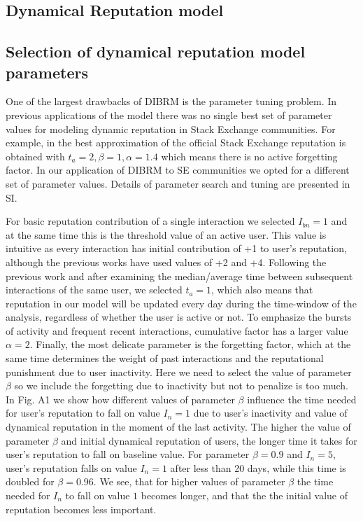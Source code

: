 \subsection{Dynamical Reputation model}

\subsection{Selection of dynamical reputation model parameters} \label{section:param}
One of the largest drawbacks of DIBRM is the parameter tuning problem. In previous applications of the model \cite{melnikovDynamicInteractionBasedReputation2018,yashkina2020} there was no single best set of parameter values for modeling dynamic reputation in Stack Exchange communities. For example, in \cite{yashkina2020} the best approximation of the official Stack Exchange reputation is obtained with $t_a =2, \beta = 1, \alpha = 1.4$ which means there is no active forgetting factor. In our application of DIBRM to SE communities we opted for a different set of parameter values. Details of parameter search and tuning are presented in SI.

For basic reputation contribution of a single interaction we selected $I_{bn} = 1$ and at the same time this is the threshold value of an active user. This value is intuitive as every interaction has initial contribution of +1 to user's reputation, although the previous works have used values of +2 and +4. Following the previous work and after examining the median/average time between subsequent interactions of the same user, we selected $t_a = 1$, which also means that reputation in our model will be updated every day during the time-window of the analysis, regardless of whether the user is active or not. To emphasize the bursts of activity and frequent recent interactions, cumulative factor has a larger value $\alpha = 2$. Finally, the most delicate parameter is the forgetting factor, which at the same time determines the weight of past interactions and the reputational punishment due to user inactivity. Here we need to select the value of parameter $\beta$ so we include the forgetting due to inactivity but not to penalize is too much. In Fig. A1 we show how different values of parameter $\beta$ influence the time needed for user's reputation to fall on value $I_{n}=1$ due to user's inactivity and value of dynamical reputation in the moment of the last activity. The higher the value of parameter $\beta$ and initial dynamical reputation of users, the longer time it takes for user's reputation to fall on baseline value. For parameter $\beta=0.9$ and $I_{n}=5$, user's reputation falls on value $I_{n}=1$ after less than 20 days, while this time is doubled for $\beta=0.96$. We see, that for higher values of parameter $\beta$ the time needed for $I_{n}$ to fall on value $1$ becomes longer, and that the the initial value of reputation becomes less important. 

